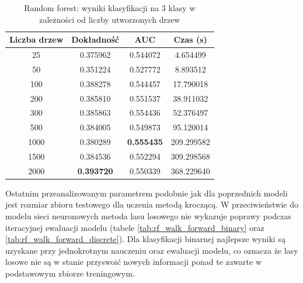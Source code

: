 \documentclass[a4paper, twoside, 11pt, openright]{article}
\begin{document}
\begin{table}[H]
    \centering
    \begin{tabular}{|c|c|c|c|}
    \hline
        \textbf{Liczba drzew} & \textbf{Dokładność} & \textbf{AUC} & \textbf{Czas (s)} \\ \hline
25         &  0.375962 &  0.544072 &    4.654499 \\ \hline
50         &  0.351224 &  0.527772 &    8.893512 \\ \hline
100       &  0.388278 &  0.544457 &   17.790018 \\ \hline
200        &  0.385810 &  0.551537 &   38.911032 \\ \hline
300        &  0.385863 &  0.554436 &   52.376497 \\ \hline
500        &  0.384005 &  0.549873 &   95.120014 \\ \hline
1000       &  0.380289 &  \textbf{0.555435} &  209.299582 \\ \hline
1500       &  0.384536 &  0.552294 &  309.298568 \\ \hline
2000      &  \textbf{0.393720} &  0.550339 &  368.229640 \\ \hline
    \end{tabular}
    \caption{Random forest: wyniki klasyfikacji na 3 klasy w zależności od liczby utworzonych drzew}
    \label{tab:rf_estimators_discrete}
\end{table}

Ostatnim przeanalizowanym parametrem podobnie jak dla poprzednich modeli jest rozmiar zbioru testowego dla uczenia metodą kroczącą. W przeciwieństwie do modelu sieci neuronowych metoda lasu losowego nie wykazuje poprawy podczas iteracyjnej ewaluacji modelu (tabele \ref{tab:rf_walk_forward_binary} oraz \ref{tab:rf_walk_forward_discrete}). Dla klasyfikacji binarnej najlepsze wyniki są uzyskane przy jednokrotnym nauczeniu oraz ewaluacji modelu, co oznacza że lasy losowe nie są w stanie przyswoić nowych informacji ponad te zawarte w podstawowym zbiorze treningowym.
\end{document}
